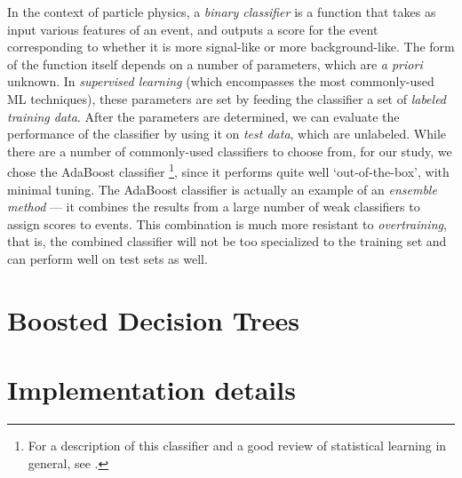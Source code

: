 In the context of particle physics, a \emph{binary classifier} is a function that takes as input various features of an event, and outputs a score for the event corresponding to whether it is more signal-like or more background-like. The form of the function itself depends on a number of parameters, which are \emph{a priori} unknown. In \emph{supervised learning} (which encompasses the most commonly-used ML techniques), these parameters are set by feeding the classifier a set of \emph{labeled training data}. After the parameters are determined, we can evaluate the performance of the classifier by using it on \emph{test data}, which are unlabeled. While there are a number of commonly-used classifiers to choose from, for our study, we chose the AdaBoost classifier \footnote{For a description of this classifier and a good review of statistical learning in general, see \citep{Hastie2011}.}, since it performs quite well `out-of-the-box', with minimal tuning. The AdaBoost classifier is actually an example of an \emph{ensemble method} --- it combines the results from a large number of weak classifiers to assign scores to events. This combination is much more resistant to \emph{overtraining}, that is, the combined classifier will not be too specialized to the training set and can perform well on test sets as well.


\section{Boosted Decision Trees}
\section{Implementation details}
